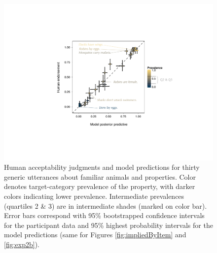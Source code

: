 \documentclass[10pt,letterpaper]{article}
\begin{document}
\begin{figure}
\centering
    \includegraphics[width=0.7\columnwidth]{truthjudge-scatter-wLabels.pdf}
    \caption{Human acceptability judgments and model predictions for thirty generic utterances about familiar animals and properties. 
    Color denotes target-category prevalence of the property, with darker colors indicating lower prevalence. 
    Intermediate prevalences (quartiles 2 \& 3) are in intermediate shades (marked on color bar).
    Error bars correspond with 95\% bootstrapped confidence intervals for the participant data and 95\% highest probability intervals for the model predictions (same for Figures \ref{fig:impliedByItem} and \ref{fig:exp2b}).
    }
  \label{fig:modeldataBars}
\end{figure}
\end{document}
